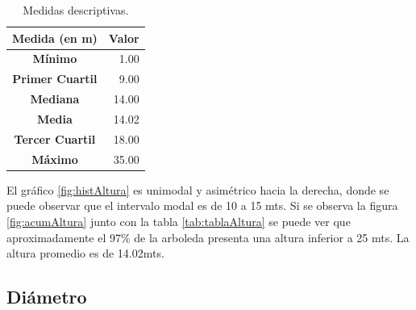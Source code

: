 \documentclass[11pt]{article}
\begin{document}
\begin{table}[h!]
  \begin{center}
    \begin{tabular}{| c | r |}
      \hline
      \textbf{Medida (en m)} & \textbf{Valor} \\ \hline
      \textbf{Mínimo} & 1.00 \\ \hline
      \textbf{Primer Cuartil} & 9.00 \\ \hline
      \textbf{Mediana} & 14.00 \\ \hline
      \textbf{Media} & 14.02 \\ \hline
      \textbf{Tercer Cuartil} & 18.00 \\ \hline
      \textbf{Máximo} & 35.00 \\ \hline
    \end{tabular}
    \caption{Medidas descriptivas.}
    \label{tab:descripAltura}
  \end{center}
\end{table}

\begin{justify}
  El gráfico \ref{fig:histAltura} es unimodal y asimétrico hacia la derecha,
  donde se puede observar que el intervalo modal es de 10 a 15 mts.
  Si se observa la figura \ref{fig:acumAltura}
  junto con la tabla \ref{tab:tablaAltura} se puede ver que aproximadamente
  el 97\% de la arboleda presenta una altura inferior a 25 mts.
  La altura promedio es de 14.02mts.
\end{justify}


\newpage
\subsection{Diámetro}
\end{document}

